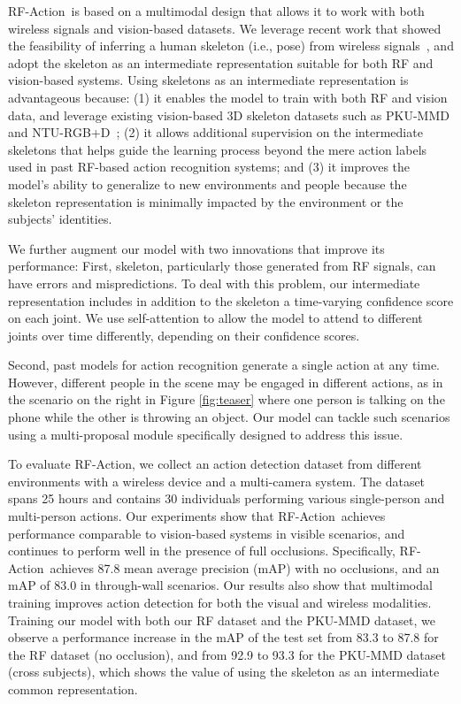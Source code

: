 \documentclass[10pt,twocolumn,letterpaper]{article}
\newcommand{\name} {RF-Action}
\begin{document}
\name\ is based on a multimodal design that allows it to work with both wireless signals and vision-based datasets. We leverage recent work that showed the feasibility of inferring a human skeleton (i.e., pose) from wireless signals~\cite{zhao2018through, zhao2018rf}, and adopt the skeleton as an intermediate representation suitable for both RF and vision-based systems. Using skeletons as an intermediate representation is advantageous because: (1) it enables the model to train with both RF and vision data, and leverage existing vision-based 3D skeleton datasets such as PKU-MMD and NTU-RGB+D~\cite{liu2017pku, shahroudy2016ntu}; (2) it allows additional supervision on the intermediate skeletons that helps guide the learning process beyond the mere action labels used in past RF-based action recognition systems; and (3) it improves the model's ability to generalize to new environments and people because the skeleton representation is minimally impacted by the environment or the subjects' identities. 

We further augment our model with two innovations that improve its performance: First, skeleton, particularly those generated from RF signals, can have errors and mispredictions.  To deal with this problem, our intermediate representation includes in addition to the skeleton a time-varying confidence score on each joint. We use self-attention to allow the model to attend to different joints over time differently, depending on their confidence scores. 

Second, past models for action recognition generate a single action at any time. However, different people in the scene may be engaged in different actions, as in the scenario on the right in Figure \ref{fig:teaser} where one person is talking on the phone while the other is throwing an object. Our model can tackle such scenarios using a multi-proposal module specifically designed to address this issue. 

To evaluate \name, we collect an action detection dataset from different environments with a wireless device and a multi-camera system. The dataset spans 25 hours and contains 30 individuals performing various single-person and multi-person actions. 
Our experiments show that \name\ achieves performance comparable to vision-based systems in visible scenarios, and continues to perform well in the presence of full occlusions. Specifically, \name\  achieves 87.8 mean average precision (mAP)  with no occlusions, and an mAP of 83.0 in through-wall scenarios. Our results also show that multimodal training improves action detection for both the visual and wireless modalities. Training our model with both our RF dataset and the PKU-MMD dataset, we observe a performance increase in the mAP of the test set from 83.3 to 87.8 for the RF dataset (no occlusion), and from 92.9 to 93.3 for the PKU-MMD dataset (cross subjects), which shows the value of using the skeleton as an intermediate common representation. 
\end{document}
